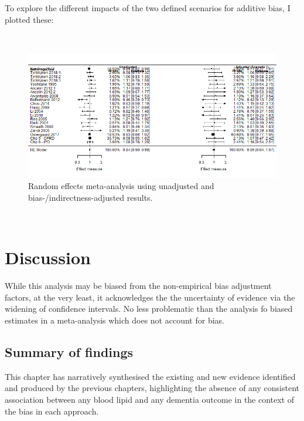\documentclass[a4paper, twoside]{templates/ociamthesis}
\begin{document}
To explore the different impacts of the two defined scenarios for additive bias, I plotted these:

~





\begin{figure}[H]
\includegraphics[width=1\linewidth]{figures/tri/fp_paired_midlife_ldl_ad} \caption[Random effects meta-analysis using unadjusted and bias-/indirectness-adjusted results.]{Random effects meta-analysis using unadjusted and bias-/indirectness-adjusted results.}\label{fig:fpLdlAd}
\end{figure}

~

\hypertarget{discussion-4}{%
\section{Discussion}\label{discussion-4}}

While this analysis may be biased from the non-empirical bias adjustment factors, at the very least, it acknowledges the the uncertainty of evidence via the widening of confidence intervals.
No less problematic than the analysis fo biased estimates in a meta-analysis which does not account for bias.

\hypertarget{summary-of-findings-3}{%
\subsection{Summary of findings}\label{summary-of-findings-3}}

This chapter has narratively synthesised the existing and new evidence identified and produced by the previous chapters, highlighting the absence of any consistent association between any blood lipid and any dementia outcome in the context of the bias in each approach.
\end{document}

